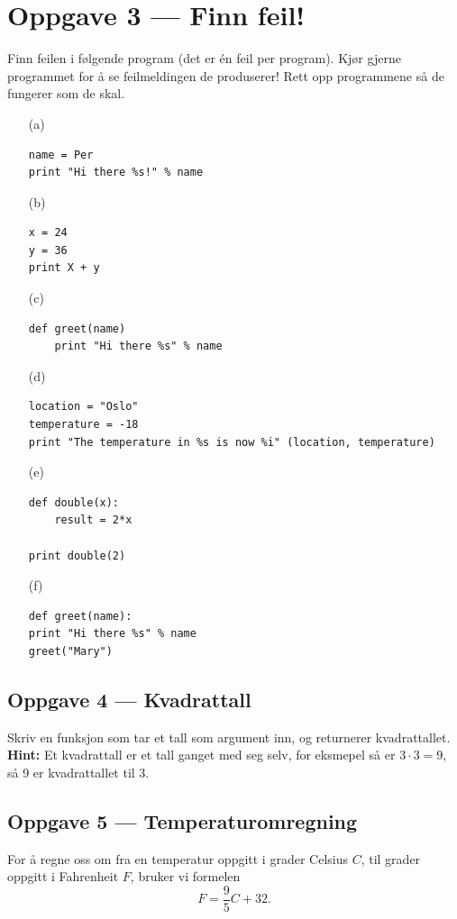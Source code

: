 \documentclass[a4paper, 11pt, notitlepage]{article}
\begin{document}
\section*{Oppgave 3 --- Finn feil!}
Finn feilen i følgende program (det er én feil per program). Kjør gjerne programmet for å se feilmeldingen de produserer! Rett opp programmene så de fungerer som de skal.
\begin{itemize}
	\item[(a)] 
\begin{lstlisting}
name = Per 
print "Hi there %s!" % name
\end{lstlisting}

\item[(b)] 
\begin{lstlisting}
x = 24
y = 36
print X + y
\end{lstlisting}

\item[(c)] 
\begin{lstlisting}
def greet(name)
	print "Hi there %s" % name
\end{lstlisting}

\item[(d)] 
\begin{lstlisting}
location = "Oslo"
temperature = -18
print "The temperature in %s is now %i" (location, temperature)
\end{lstlisting}

\item[(e)] 
\begin{lstlisting}
def double(x):
	result = 2*x

print double(2)
\end{lstlisting}

\item[(f)] 
\begin{lstlisting}
def greet(name):
print "Hi there %s" % name
greet("Mary")
\end{lstlisting}
\end{itemize}

\subsection*{Oppgave 4 --- Kvadrattall}
Skriv en funksjon som tar et tall som argument inn, og returnerer kvadrattallet. \\ \textbf{Hint:} Et kvadrattall er et tall ganget med seg selv, for eksmepel så er $3\cdot 3 = 9$, så 9 er kvadrattallet til 3.

\subsection*{Oppgave 5 --- Temperaturomregning}
For å regne oss om fra en temperatur oppgitt i grader Celsius $C$, til grader oppgitt i Fahrenheit $F$, bruker vi formelen
$$F = \frac{9}{5}C + 32.$$
\end{document}
